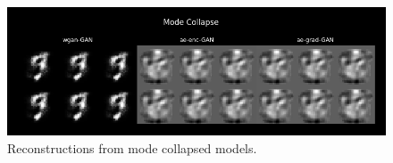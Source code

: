 \documentclass{article}
\begin{document}
\begin{figure}[!h]
    \centering
    \includegraphics[width=\columnwidth]{images/mode_collapse.png}
    \caption{Reconstructions from mode collapsed models.}
    \label{fig:mode_collapse}
\end{figure}   
\end{document}
